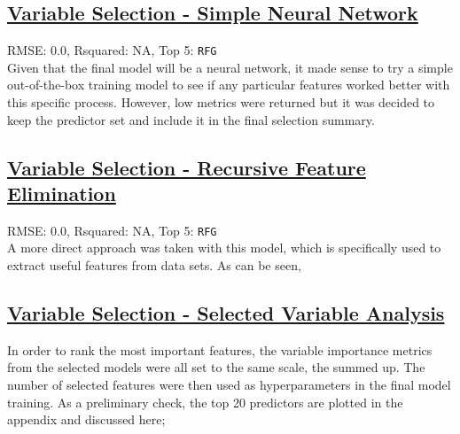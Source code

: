 \subsection{\hyperref[appendix:electricity:snn]{Variable Selection - Simple Neural Network}}
RMSE: 0.0, Rsquared: NA, Top 5: \lstinline{RFG}
\\[0.0in]
\indent Given that the final model will be a neural network, it made sense to try a simple out-of-the-box training model to see if any particular features worked better with this specific process.  However, low metrics were returned but it was decided to keep the predictor set and include it in the final selection summary.

\subsection{\hyperref[appendix:electricity:rfe]{Variable Selection - Recursive Feature Elimination}}
RMSE: 0.0, Rsquared: NA, Top 5: \lstinline{RFG}
\\[0.0in]
\indent A more direct approach was taken with this model, which is specifically used to extract useful features from data sets.  As can be seen, 

\subsection{\hyperref[appendix:electricity:sv]{Variable Selection - Selected Variable Analysis}}
In order to rank the most important features, the variable importance metrics from the selected models were all set to the same scale, the summed up.  The number of selected features were then used as hyperparameters in the final model training.  As a preliminary check, the top 20 predictors are plotted in the appendix and discussed here;


